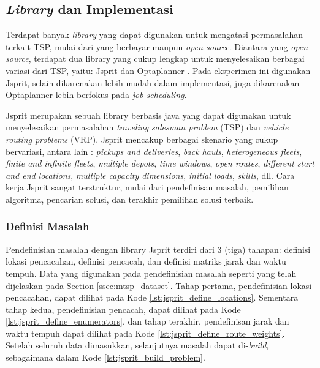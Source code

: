 \subsection{\textit{Library} dan Implementasi}
Terdapat banyak \textit{library} yang dapat digunakan untuk mengatasi permasalahan terkait TSP, mulai dari yang berbayar maupun \textit{open source}. Diantara yang \textit{open source}, terdapat dua library yang cukup lengkap untuk menyelesaikan berbagai variasi dari TSP, yaitu: Jsprit \citep{jsprit_jsprit_2014} dan Optaplanner \citep{optaplanner_constraint_2016}. Pada eksperimen ini digunakan Jsprit, selain dikarenakan lebih mudah dalam implementasi, juga dikarenakan Optaplanner lebih berfokus pada \textit{job scheduling}.

Jsprit merupakan sebuah library berbasis java yang dapat digunakan untuk menyelesaikan permasalahan \textit{traveling salesman problem} (TSP) dan \textit{vehicle routing problems} (VRP). Jsprit mencakup berbagai skenario yang cukup bervariasi, antara lain : \textit{pickups and deliveries}, \textit{back hauls}, \textit{heterogeneous fleets}, \textit{finite and infinite fleets}, \textit{multiple depots}, \textit{time windows}, \textit{open routes}, \textit{different start and end locations}, \textit{multiple capacity dimensions}, \textit{initial loads}, \textit{skills}, dll. Cara kerja Jsprit sangat terstruktur, mulai dari pendefinisan masalah, pemilihan algoritma, pencarian solusi, dan terakhir pemilihan solusi terbaik.


\subsubsection{Definisi Masalah}
Pendefinisian masalah dengan library Jsprit terdiri dari 3 (tiga) tahapan: definisi lokasi pencacahan, definisi pencacah, dan definisi matriks jarak dan waktu tempuh. Data yang digunakan pada pendefinisian masalah seperti yang telah dijelaskan pada Section \ref{ssec:mtsp_dataset}. Tahap pertama, pendefinisian lokasi pencacahan, dapat dilihat pada Kode \ref{lst:jsprit_define_locations}. Sementara tahap kedua, pendefinisian pencacah, dapat dilihat pada Kode \ref{lst:jsprit_define_enumerators}, dan tahap terakhir, pendefinisan jarak dan waktu tempuh dapat dilihat pada Kode \ref{lst:jsprit_define_route_weights}. Setelah seluruh data dimasukkan, selanjutnya masalah dapat di-\textit{build}, sebagaimana dalam Kode \ref{lst:jsprit_build_problem}.


